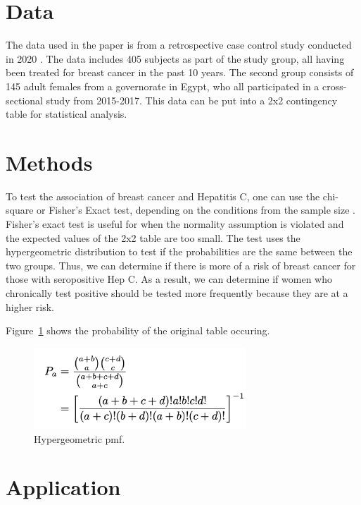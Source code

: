\documentclass[12pt, titlepage]{article}
\begin{document}
\section{Data}
\label{sec:data}

The data used in the paper is from a retrospective case control study 
conducted in 2020 \citep{2020association}. The data includes 405 subjects 
as part of the study group, all having been treated for breast cancer in the 
past 10 years. The second group consists of 145 adult females from a 
governorate in Egypt, who all participated in a cross-sectional study 
from 2015-2017. This data can be put into a 2x2 contingency table
for statistical analysis. 


\section{Methods}
\label{sec:methods}

To test the association of breast cancer and Hepatitis C, one can use
the chi-square or Fisher's Exact test, depending on the
conditions from the sample size \citep{warner2013testing}. Fisher's
exact test is useful for when the normality assumption is violated 
and the expected values of the 2x2 table are too small. The test uses 
the hypergeometric distribution to test if the probabilities are
the same between the two groups. Thus, we can determine if there is 
more of a risk of breast cancer for those with seropositive Hep C. As
 a result, we can determine if women who chronically test positive should 
 be tested more frequently because they are at a higher risk. 
 
Figure~\ref{fig:formula} shows the probability of the original table occuring.

\begin{figure}[tbp]
  \centering
  \includegraphics[width=8cm]{formula.png}
  \caption{Hypergeometric pmf.}
  \label{fig:formula}
\end{figure}


\section{Application}
\label{sec:app}
\end{document}
